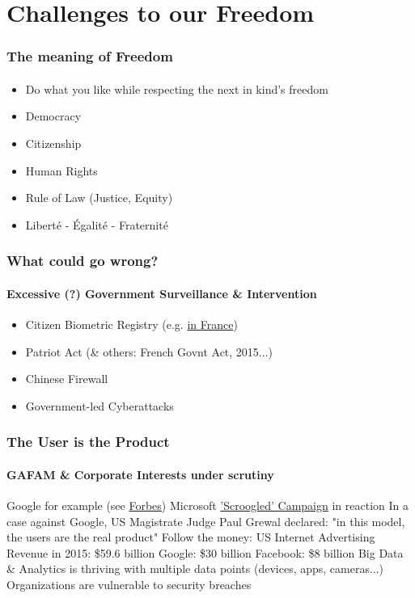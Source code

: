 \section[Section]{Challenges to our Freedom}
	\begin{frame}
	\frametitle{The meaning of Freedom}
	\framesubtitle{}
		\begin{itemize}[<+->]
			\item Do what you like while respecting the next in kind's freedom
			\item Democracy
			\item Citizenship
			\item Human Rights
			\item Rule of Law (Justice, Equity)
			\item Liberté - Égalité - Fraternité
		\end{itemize}
	\end{frame}

	\begin{frame}
	\frametitle{What could go wrong?}
	\framesubtitle{Excessive (?) Government Surveillance \& Intervention}
		\begin{itemize}[<+->]
			\item Citizen Biometric Registry (e.g. \href{http://www.pcworld.com/article/3139461/security/french-plan-for-biometric-database-of-60-million-people-sparks-outcry.html}{in France})
			\item Patriot Act (\& others: French Govnt Act, 2015...)
			\item Chinese Firewall
			\item Government-led Cyberattacks
		\end{itemize}
	\end{frame}

	\begin{frame}
	\frametitle{The User is the Product}
	\framesubtitle{GAFAM \& Corporate Interests under scrutiny}
		\begin{outline}
			\1 Google for example (see \href{http://www.forbes.com/sites/benkepes/2013/12/04/google-users-youre-the-product-not-the-customer/\#2871b0bc1624}{Forbes})
			\1 Microsoft \href{http://www.businessinsider.com/microsoft-shuts-down-scroogled-website-2015-1}{'Scroogled' Campaign} in reaction
			\1 In a case against Google, US Magistrate Judge Paul Grewal declared: "in this model, the users are the real product"
			\1 Follow the money:
				\2 US Internet Advertising Revenue in 2015: \$59.6 billion
				\2 Google: \$30 billion
				\2 Facebook: \$8 billion
			\1 Big Data \& Analytics is thriving with multiple data points (devices, apps, cameras...)
			\1 Organizations are vulnerable to security breaches
		\end{outline}
	\end{frame}


